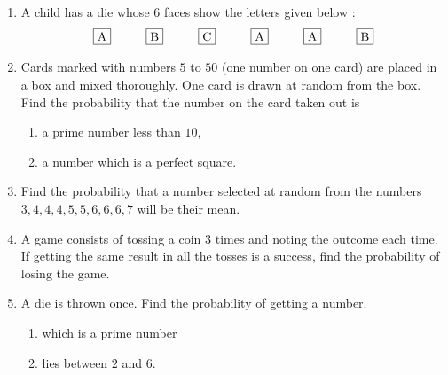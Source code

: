 \begin{enumerate}
\item A child has a die whose $6$ faces show the letters given below :
\begin{align*}
    { \framebox {A} \hspace{1cm}} {\framebox {B} \hspace{1cm}} {\framebox {C}\hspace{1cm}} {\framebox {A}\hspace{1cm}} {\framebox {A}\hspace{1cm}} {\framebox {B}}
\end{align*}

\item Cards marked with numbers $5$ to $50$ (one number on one card) are placed in a box and mixed thoroughly. One card is drawn at random from the box. Find the probability that the number on the card taken out is \begin{enumerate}
    \item a prime number less than $10$,  
    \item a number which is a perfect square.
\end{enumerate}

\item Find the probability that a number selected at random from the numbers $3, 4, 4, 4, 5, 5, 6, 6, 6, 7$ will be their mean.

\item A game consists of tossing a coin $3$ times and noting the outcome each time. If getting the same result in all the tosses is a success, find the probability of losing the game.
\item A die is thrown once. Find the probability of getting a number.
\begin{enumerate}[label={\Roman*.}]
\item which is a prime number
\item lies between $2$ and $6$.
\end{enumerate}
\end{enumerate}
